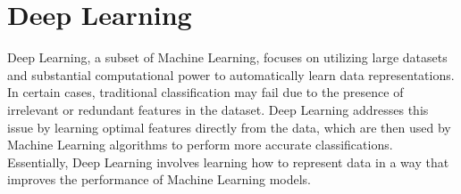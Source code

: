 \section{Deep Learning}

Deep Learning, a subset of Machine Learning, focuses on utilizing large datasets and substantial computational power to automatically learn data representations. 
In certain cases, traditional classification may fail due to the presence of irrelevant or redundant features in the dataset. 
Deep Learning addresses this issue by learning optimal features directly from the data, which are then used by Machine Learning algorithms to perform more accurate classifications. 
Essentially, Deep Learning involves learning how to represent data in a way that improves the performance of Machine Learning models.